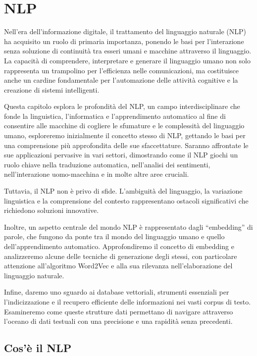 \chapter{NLP}\label{NLP}
Nell'era dell'informazione digitale, il trattamento del linguaggio naturale (NLP) ha acquisito un ruolo di primaria importanza, ponendo le basi per l'interazione senza soluzione di continuità tra esseri umani e macchine attraverso il linguaggio. La capacità di comprendere, interpretare e generare il linguaggio umano non solo rappresenta un trampolino per l'efficienza nelle comunicazioni, ma costituisce anche un cardine fondamentale per l'automazione delle attività cognitive e la creazione di sistemi intelligenti.

Questa capitolo esplora le profondità del NLP, un campo interdisciplinare che fonde la linguistica, l'informatica e l'apprendimento automatico al fine di consentire alle macchine di cogliere le sfumature e le complessità del linguaggio umano, esploreremo inizialmente il concetto stesso di NLP, gettando le basi per una comprensione più approfondita delle sue sfaccettature. Saranno affrontate le sue applicazioni pervasive in vari settori, dimostrando come il NLP giochi un ruolo chiave nella traduzione automatica, nell'analisi dei sentimenti, nell'interazione uomo-macchina e in molte altre aree cruciali.

Tuttavia, il NLP non è privo di sfide. L'ambiguità del linguaggio, la variazione linguistica e la comprensione del contesto rappresentano ostacoli significativi che richiedono soluzioni innovative.

Inoltre, un aspetto centrale del mondo NLP è rappresentato dagli ``embedding'' di parole, che fungono da ponte tra il mondo del linguaggio umano e quello dell'apprendimento automatico. Approfondiremo il concetto di embedding e analizzeremo alcune delle tecniche di generazione degli stessi, con particolare attenzione all'algoritmo Word2Vec e alla sua rilevanza nell'elaborazione del linguaggio naturale.

Infine, daremo uno sguardo ai database vettoriali, strumenti essenziali per l'indicizzazione e il recupero efficiente delle informazioni nei vasti corpus di testo. Esamineremo come queste strutture dati permettano di navigare attraverso l'oceano di dati testuali con una precisione e una rapidità senza precedenti.
\section{Cos'è il NLP}

